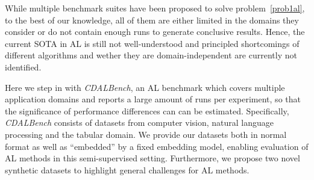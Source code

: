 \documentclass[]{article}
\begin{document}
While multiple benchmark suites have been proposed to solve
problem~\ref{prob1al}, to the best of
our knowledge, all of them are either limited in the domains they consider or do
not contain enough runs to generate conclusive results.
Hence, the current SOTA in AL is still not well-understood and principled
shortcomings of different algorithms and wether they are domain-independent are currently not identified.

Here we step in with \emph{CDALBench}, an AL benchmark which covers
multiple application domains and reports a large amount of runs per
experiment, so that the significance of performance differences can can be
estimated. Specifically, \emph{CDALBench} consists of datasets from
computer vision, natural language processing and the tabular domain. We provide
our datasets both in normal format %
as well as ``embedded'' by a fixed embedding model, enabling evaluation of AL methods in
this semi-supervised setting.
Furthermore, we propose two novel synthetic datasets to highlight general
challenges for AL methods.
\end{document}
